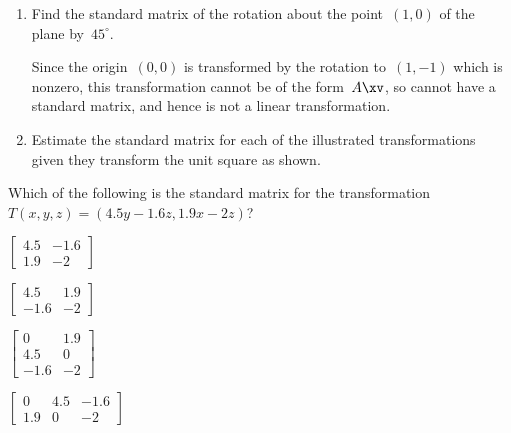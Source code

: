 \begin{example}
\begin{enumerate}
\item Find the standard matrix of the rotation about the point~\((1,0)\) of the plane by~\(45^\circ\).
\begin{solution} 
Since the origin~\((0,0)\) is transformed by the rotation to~\((1,-1)\) which is nonzero, this transformation cannot be of the form~\(A\xv\), so cannot have a standard matrix, and hence is not a linear transformation.
\end{solution}


\item Estimate the standard matrix for each of the illustrated transformations given they transform the unit square as shown.
\def\unithousesize{footnotesize,grid}
\newcommand{\TwoDmat}[4]{\TwoD{#1}{#2}{#3}{#4}
\\\emph{Solution:} Here \(T(1,0)\approx(#1,#3)\) and \(T(0,1)\approx(#2,#4)\) so the approximate standard matrix is \(\begin{bmatrix} #1&#2\\#3&#4 \end{bmatrix}\).}

\end{enumerate}
\end{example}




\begin{activity}
Which of the following is the standard matrix for the transformation \(T(x,y,z)=(4.5y-1.6z,1.9x-2z)\)?
\begin{parts}
\item \(\begin{bmatrix} 4.5&-1.6\\1.9&-2 \end{bmatrix}\)
\item \(\begin{bmatrix} 4.5&1.9\\-1.6&-2 \end{bmatrix}\)
\item \(\begin{bmatrix} 0&1.9\\4.5&0\\-1.6&-2 \end{bmatrix}\)
\item \(\begin{bmatrix} 0&4.5&-1.6\\1.9&0&-2 \end{bmatrix}\)
\end{parts}
\end{activity}




